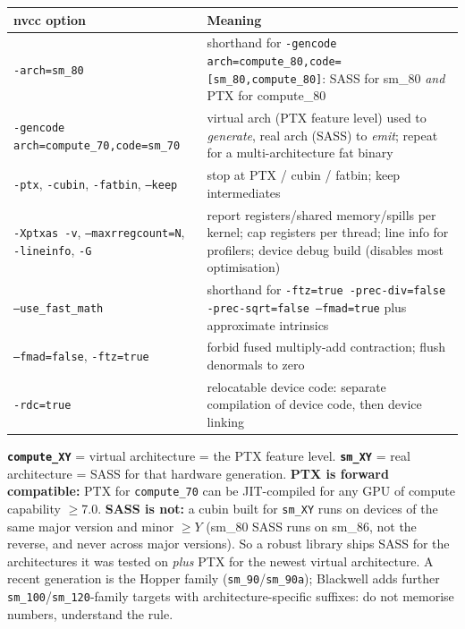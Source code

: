 \documentclass[10pt,a4paper,openany,oneside]{report}
\begin{document}
\begin{center}\small
\begin{xltabular}{\textwidth}{@{}L{4.9cm}Y@{}}
\toprule
\textbf{nvcc option} & \textbf{Meaning}\\
\midrule\endhead
\texttt{-arch=sm\_80} & shorthand for \texttt{-gencode arch=compute\_80,code=[sm\_80,compute\_80]}: SASS for sm\_80 \emph{and} PTX for compute\_80\\
\texttt{-gencode arch=compute\_70,code=sm\_70} & virtual arch (PTX feature level) used to \emph{generate}, real arch (SASS) to \emph{emit}; repeat for a multi-architecture fat binary\\
\texttt{-ptx}, \texttt{-cubin}, \texttt{-fatbin}, \texttt{--keep} & stop at PTX / cubin / fatbin; keep intermediates\\
\texttt{-Xptxas -v}, \texttt{--maxrregcount=N}, \texttt{-lineinfo}, \texttt{-G} & report registers/shared memory/spills per kernel; cap registers per thread; line info for profilers; device debug build (disables most optimisation)\\
\texttt{--use\_fast\_math} & shorthand for \texttt{-ftz=true -prec-div=false -prec-sqrt=false --fmad=true} plus approximate intrinsics\\
\texttt{--fmad=false}, \texttt{-ftz=true} & forbid fused multiply-add contraction; flush denormals to zero\\
\texttt{-rdc=true} & relocatable device code: separate compilation of device code, then device linking\\
\bottomrule
\end{xltabular}
\end{center}
\begin{trapbox}
\textbf{\texttt{compute\_XY}} = virtual architecture = the PTX feature level. \textbf{\texttt{sm\_XY}} = real architecture = SASS for that hardware generation. \textbf{PTX is forward compatible:} PTX for \texttt{compute\_70} can be JIT-compiled for any GPU of compute capability $\ge$7.0. \textbf{SASS is not:} a cubin built for \texttt{sm\_XY} runs on devices of the same major version and minor $\ge Y$ (sm\_80 SASS runs on sm\_86, not the reverse, and never across major versions). So a robust library ships SASS for the architectures it was tested on \emph{plus} PTX for the newest virtual architecture. A recent generation is the Hopper family (\texttt{sm\_90}/\texttt{sm\_90a}); Blackwell adds further \texttt{sm\_100}/\texttt{sm\_120}-family targets with architecture-specific suffixes: do not memorise numbers, understand the rule.
\end{trapbox}
\end{document}
